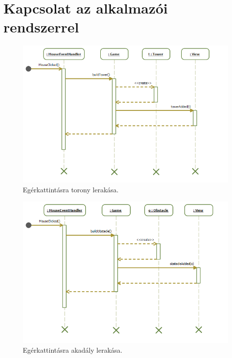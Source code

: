\section{Kapcsolat az alkalmazói rendszerrel}

\begin{figure}[H]
\begin{center}
\includegraphics[width=18cm]{images/grafikaSeq/mouseTower.png}
\caption{Egérkattintásra torony lerakása.}
\label{fig:Graphic_mouse_tower}
\end{center}
\end{figure}

\begin{figure}[H]
\begin{center}
\includegraphics[width=18cm]{images/grafikaSeq/mouseOb.png}
\caption{Egérkattintásra akadály lerakása.}
\label{fig:Graphic_mouse_obstacle}
\end{center}
\end{figure}

